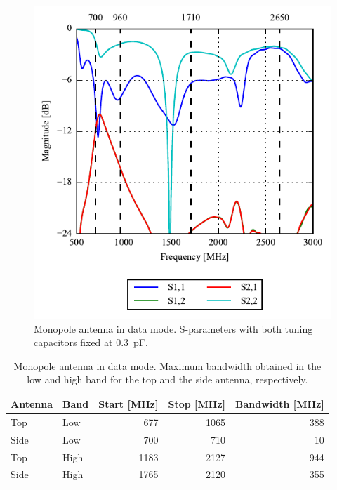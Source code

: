 \begin{figure}[htbp]
    \centering
    \includegraphics{img/tech_sol/monopole/data_mode/sparam_data.pdf}
    \caption{Monopole antenna in data mode. S-parameters with both tuning capacitors fixed at \SI{0.3}{pF}.}
    \label{fig:triang_sparam_data}
\end{figure}

\begin{table}[htbp]
  \centering
  \begin{tabular}{|l|l|r|r|r|}
    \hline
    Antenna & Band & Start [MHz] & Stop [MHz] & Bandwidth [MHz] \\
    \hline
    Top     & Low  &  677  & 1065  & 388 \\
    Side    & Low  &  700  & 710  & 10  \\
    \hline
    Top     & High &  1183 &  2127  & 944 \\
    Side    & High & 1765 &  2120 & 355 \\
    \hline
  \end{tabular}
  \caption{Monopole antenna in data mode. Maximum bandwidth obtained in the low and high band for the top and the side antenna, respectively.}    
  \label{tab:bw_sol1data}
\end{table}

